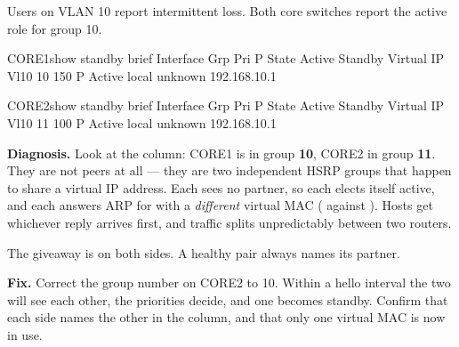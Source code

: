 \begin{breakfix}
Users on VLAN 10 report intermittent loss. Both core switches report the active
role for group 10.

\begin{verify}{CORE1}{show standby brief}
Interface   Grp  Pri P State    Active          Standby         Virtual IP
Vl10        10   150 P Active   local           unknown         192.168.10.1
\end{verify}

\begin{verify}{CORE2}{show standby brief}
Interface   Grp  Pri P State    Active          Standby         Virtual IP
Vl10        11   100 P Active   local           unknown         192.168.10.1
\end{verify}

\textbf{Diagnosis.} Look at the  column: CORE1 is in group \textbf{10},
CORE2 in group \textbf{11}. They are not peers at all --- they are two independent
HSRP groups that happen to share a virtual IP address. Each sees no partner, so
each elects itself active, and each answers ARP for  with a
\emph{different} virtual MAC ( against
). Hosts get whichever reply arrives first, and traffic
splits unpredictably between two routers.

The giveaway is  on both sides. A healthy pair always names
its partner.

\textbf{Fix.} Correct the group number on CORE2 to 10. Within a hello interval the
two will see each other, the priorities decide, and one becomes standby. Confirm
that each side names the other in the  column, and that only one
virtual MAC is now in use.
\end{breakfix}

